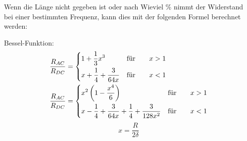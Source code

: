 Wenn die Länge nicht gegeben ist oder nach Wieviel \% nimmt der Widerstand bei
einer bestimmten Frequenz, kann dies mit der folgenden Formel berechnet werden:

\begin{description}
    \item Bessel-Funktion:
          \begin{align*}
              \frac{R_{AC}}{R_{DC}} & =
              \begin{dcases}
                  1 + \frac{1}{3}x^3              & \text{für} \qquad x > 1 \\
                  x + \frac{1}{4} + \frac{3}{64x} & \text{für} \qquad x < 1 \\
              \end{dcases} \\
              \frac{R_{AC}}{R_{DC}} & =
              \begin{dcases}
                  x^2\left( 1-\frac{x^4}{6} \right)                               & \text{für} \qquad x > 1 \\
                  x- \frac{1}{4} + \frac{3}{64x} + \frac{1}{4} + \frac{3}{128x^2} & \text{für} \qquad x < 1 \\
              \end{dcases}
          \end{align*}
          \[
              \boxed{x=\frac{R}{2\delta}}
          \]
\end{description}

